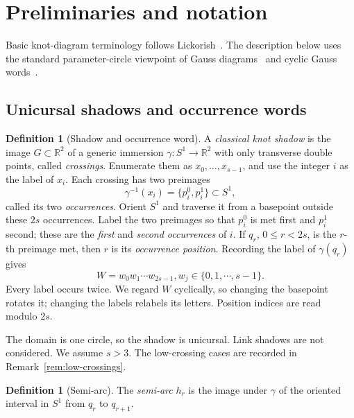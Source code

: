 \documentclass[11pt]{amsart}
\theoremstyle{definition}
\newtheorem{definition}[theorem]{Definition}
\theoremstyle{remark}
\begin{document}
\section{Preliminaries and notation}\label{sec:states}

Basic knot-diagram terminology follows Lickorish~\cite[Chapter~1]
{Lickorish1997}.  The description below uses the standard parameter-circle
viewpoint of Gauss diagrams~\cite[Section~1]{PolyakViro1994} and cyclic Gauss
words~\cite[Introduction and Section~5.1]{Turaev2004}.

\subsection{Unicursal shadows and occurrence words}

\begin{definition}[Shadow and occurrence word]\label{def:shadow}
A \emph{classical knot shadow} is the image \(G\subset\mathbb R^2\) of a
generic immersion \(\gamma:S^1\to\mathbb R^2\) with only transverse double
points, called \emph{crossings}.  Enumerate them as
\(x_0,\ldots,x_{s-1}\), and use the integer \(i\) as the label of \(x_i\).
Each crossing has two preimages
\[
  \gamma^{-1}(x_i)=\{p_i^0,p_i^1\}\subset S^1,
\]
called its two \emph{occurrences}.  Orient \(S^1\) and traverse it from a
basepoint outside these \(2s\) occurrences.  Label the two preimages so that
\(p_i^0\) is met first and \(p_i^1\) second; these are the \emph{first} and
\emph{second occurrences} of \(i\).  If \(q_r\), \(0\le r<2s\), is the
\(r\)-th preimage met, then \(r\) is its \emph{occurrence position}.
Recording the label of
\(\gamma(q_r)\) gives
\begin{equation}\label{eq:word}
  W=w_0w_1\cdots w_{2s-1},  w_j\in \{0,1,\cdots, s-1\}.
\end{equation}
Every label occurs twice.  We regard \(W\) cyclically, so changing the
basepoint rotates it; changing the labels relabels its letters.  
Position indices are read modulo \(2s\).
\end{definition}

The domain is one circle, so the shadow is unicursal. Link shadows are not
considered.  We assume \(s>3\). The low-crossing cases are recorded in
Remark~\ref{rem:low-crossings}.

\begin{definition}[Semi-arc]\label{def:semiarc}
The \emph{semi-arc} \(h_r\) is the image under \(\gamma\) of the oriented
interval in \(S^1\) from \(q_r\) to \(q_{r+1}\). 
\end{definition}
\end{document}
